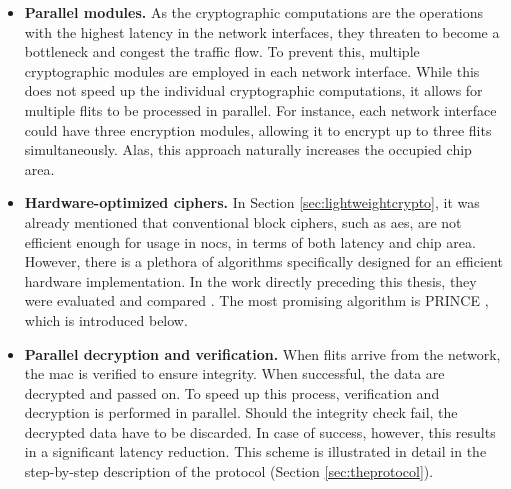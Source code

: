 \begin{itemize}
    \item \textbf{Parallel modules.} As the cryptographic computations are the operations with the highest latency in the network interfaces, they
        threaten to become a bottleneck and congest the traffic flow. To prevent this, multiple cryptographic modules are employed in each network
        interface. While this does not speed up the individual cryptographic computations, it allows for multiple flits to be processed in parallel. For
        instance, each network interface could have three encryption modules, allowing it to encrypt up to three flits simultaneously. Alas, this
        approach naturally increases the occupied chip area.
    \item \textbf{Hardware-optimized ciphers.} In Section \ref{sec:lightweightcrypto}, it was already mentioned that conventional block ciphers, such
        as \gls{aes}, are not efficient enough for usage in \glspl{noc}, in terms of both latency and chip area. However, there is a plethora of
        algorithms specifically designed for an efficient hardware implementation. In the work directly preceding this thesis, they were evaluated and
        compared \cite{harttung17lightweightcrypto}. The most promising algorithm is PRINCE \cite{borghoff12prince}, which is introduced below.
    \item \textbf{Parallel decryption and verification.} When flits arrive from the network, the \gls{mac} is verified to ensure integrity. When
        successful, the data are decrypted and passed on. To speed up this process, verification and decryption is performed in parallel. Should the
        integrity check fail, the decrypted data have to be discarded. In case of success, however, this results in a significant latency reduction.
        This scheme is illustrated in detail in the step-by-step description of the protocol (Section \ref{sec:theprotocol}).
\end{itemize}

